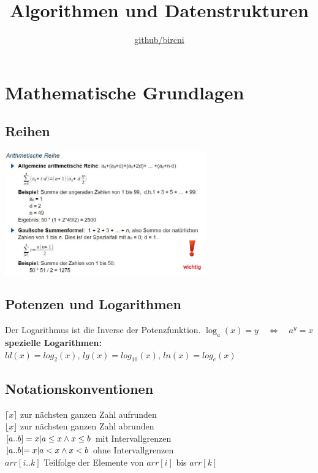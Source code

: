 \documentclass{scrreprt}
\title{\textbf{Algorithmen und Datenstrukturen}}
\author{\href{https://github.com/bircni}{\color{blue}github/bircni}}
\begin{document}
\maketitle
\pagebreak
\renewcommand{\contentsname}{Inhaltsverzeichnis}
\setcounter{tocdepth}{1}
\tableofcontents
{}
\pagebreak
\chapter{Mathematische Grundlagen}
\section{Reihen}
\includegraphics[width=0.65\textwidth]{graphics/reihen-arithmetisch}
\section{Potenzen und Logarithmen}
Der Logarithmus ist die Inverse der Potenzfunktion. $\log_a(x) = y \quad \Longleftrightarrow  \quad a^y = x$
\\\textbf{spezielle Logarithmen:}
\\$ld(x)=log_2(x)$, $lg(x)=log_10(x)$, $ln(x)=log_e(x)$
\section{Notationskonventionen}
$\lceil x \rceil$ zur nächsten ganzen Zahl aufrunden
\\$\lfloor x \rfloor$ zur nächsten ganzen Zahl abrunden
\\$[a .. b] = {x \arrowvert a \leq x \wedge x \leq b}$ mit Intervallgrenzen
\\$]a .. b[ = {x \arrowvert a < x \wedge x < b}$ ohne Intervallgrenzen
\\$arr[i .. k]$ Teilfolge der Elemente von $arr[i]$ bis $arr[k]$
\end{document}

